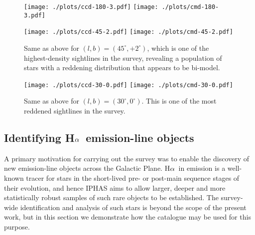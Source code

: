 \documentclass[useAMS,usenatbib]{mn2e}
\def\ha{\mbox{H$\rm \alpha$}}
\begin{document}
\begin{figure*}
    \begin{minipage}[b]{\linewidth}
        \texttt{[image: ./plots/ccd-180-3.pdf]} 
        \texttt{[image: ./plots/cmd-180-3.pdf]}
    \end{minipage}
    \caption{Colour-colour and colour-magnitude diagram (left and right panel)
    showing sources flagged as \emph{veryReliable}
    located in an area of one square degree
    centred near the Galactic anti-centre 
    at $(l,b)=(180^\circ,+3^\circ)$.
    The colour-colour diagram shows the
    position of the main sequence (thin solid line),
    giant stars (thick solid line)
    and the reddening track for an A0V-type star (dashed line)
    based on the \citet{Pickles1998} library of empirical spectra.
    The colour-magnitude only show the reddening vector
    along with the unreddened 1~Gyr isochrone due to \citet{Bressan2012},
    which has been placed at an arbitrary distance of 2~kpc for reference.
    This is one of the least reddened sightlines
    in the survey %
    and hence the observed stellar population appears to be dominated 
    by lowly reddened main sequence stars.}
    \label{fig:l180}
    \begin{minipage}[b]{\linewidth}
        \texttt{[image: ./plots/ccd-45-2.pdf]}
        \texttt{[image: ./plots/cmd-45-2.pdf]}
    \end{minipage}
    \caption{Same as above for $(l,b)=(45^\circ,+2^\circ)$,
    which is one of the highest-density sightlines in the survey,
    revealing a population of stars with a reddening distribution
    that appears to be bi-model.}
    \label{fig:l45}
    \begin{minipage}[b]{\linewidth}
        \texttt{[image: ./plots/ccd-30-0.pdf]}
        \texttt{[image: ./plots/cmd-30-0.pdf]} 
    \end{minipage}
    \caption{Same as above for $(l,b)=(30^\circ,0^\circ)$.
    This is one of the most reddened sightlines in the survey.
    }
    \label{fig:l30}
\end{figure*}

\subsection{Identifying \ha\ emission-line objects}

A primary motivation for carrying
out the survey 
was to enable the discovery of 
new emission-line objects across the Galactic Plane.
\ha\ in emission is a well-known tracer
for stars in the short-lived pre- or
post-main sequence stages of their evolution,
and hence IPHAS aims to allow larger, deeper
and more statistically robust samples of such rare objects
to be established.
The survey-wide identification and analysis 
of such stars is beyond the scope of the present work,
but in this section we demonstrate how the
catalogue may be used for this purpose.
\end{document}
